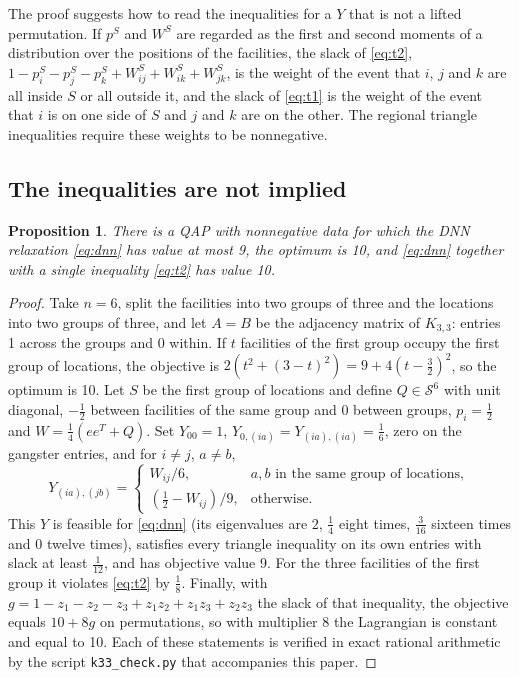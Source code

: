 \documentclass[11pt]{article}
\newtheorem{proposition}{Proposition}
\theoremstyle{remark}
\newcommand{\Sym}{\mathcal{S}}
\begin{document}
The proof suggests how to read the inequalities for a $Y$ that is not a lifted
permutation. If $p^S$ and $W^S$ are regarded as the first and second moments of
a distribution over the positions of the facilities, the slack of \eqref{eq:t2},
$1 - p_i^S - p_j^S - p_k^S + W_{ij}^S + W_{ik}^S + W_{jk}^S$, is the weight of the
event that $i$, $j$ and $k$ are all inside $S$ or all outside it, and the slack
of \eqref{eq:t1} is the weight of the event that $i$ is on one side of $S$ and
$j$ and $k$ are on the other. The regional triangle inequalities require these
weights to be nonnegative.

\subsection{The inequalities are not implied}

\begin{proposition}\label{prop:strict}
There is a QAP with nonnegative data for which the DNN relaxation \eqref{eq:dnn}
has value at most 9, the optimum is 10, and \eqref{eq:dnn} together with a single
inequality \eqref{eq:t2} has value 10.
\end{proposition}
\begin{proof}
Take $n = 6$, split the facilities into two groups of three and the locations
into two groups of three, and let $A = B$ be the adjacency matrix of $K_{3,3}$:
entries 1 across the groups and 0 within. If $t$ facilities of the first group
occupy the first group of locations, the objective is
$2(t^2 + (3-t)^2) = 9 + 4(t-\tfrac32)^2$, so the optimum is 10. Let $S$ be the
first group of locations and define $Q\in\Sym^6$ with unit diagonal, $-\frac12$
between facilities of the same group and 0 between groups, $p_i = \frac12$ and
$W = \frac14(ee^T + Q)$. Set $Y_{00} = 1$,
$Y_{0,(ia)} = Y_{(ia),(ia)} = \frac16$, zero on the gangster entries, and for
$i\ne j$, $a\ne b$,
\[
  Y_{(ia),(jb)} = \begin{cases} W_{ij}/6, & a, b \text{ in the same group of locations},\\
  (\frac12 - W_{ij})/9, & \text{otherwise}. \end{cases}
\]
This $Y$ is feasible for \eqref{eq:dnn} (its eigenvalues are $2$, $\frac14$ eight
times, $\frac3{16}$ sixteen times and $0$ twelve times), satisfies every triangle
inequality on its own entries with slack at least $\frac1{12}$, and has objective
value 9. For the three facilities of the first group it violates \eqref{eq:t2} by
$\frac18$. Finally, with $g = 1 - z_1 - z_2 - z_3 + z_1z_2 + z_1z_3 + z_2z_3$
the slack of that inequality, the objective equals $10 + 8g$ on permutations, so
with multiplier 8 the Lagrangian is constant and equal to 10.
Each of these statements is verified in exact rational arithmetic by the script
\texttt{k33\_check.py} that accompanies this paper.
\end{proof}
\end{document}
